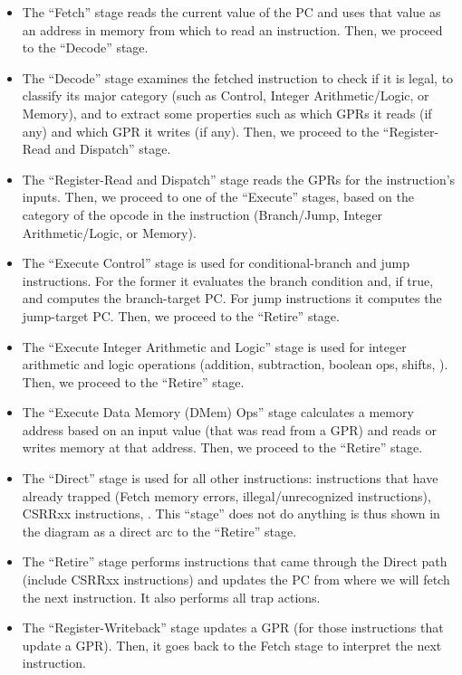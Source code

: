 \begin{itemize}

\item The ``Fetch'' stage reads the current value of the PC and uses
  that value as an address in memory from which to read an
  instruction.  Then, we proceed to the ``Decode'' stage.

\item The ``Decode'' stage examines the fetched instruction to check
  if it is legal, to classify its major category (such as Control,
  Integer Arithmetic/Logic, or Memory), and to extract some properties
  such as which GPRs it reads (if any) and which GPR it writes (if
  any).  Then, we proceed to the ``Register-Read and Dispatch'' stage.

\item The ``Register-Read and Dispatch'' stage reads the GPRs for the
instruction's inputs.  Then, we proceed to one of the ``Execute''
stages, based on the category of the opcode in the instruction
(Branch/Jump, Integer Arithmetic/Logic, or Memory).

\item The ``Execute Control'' stage is used for conditional-branch and
jump instructions.  For the former it evaluates the branch condition
and, if true, and computes the branch-target PC.  For jump
instructions it computes the jump-target PC.  Then, we proceed to the
``Retire'' stage.

\item The ``Execute Integer Arithmetic and Logic'' stage is used for
integer arithmetic and logic operations (addition, subtraction,
boolean ops, shifts, {\etc}).  Then, we proceed to the ``Retire''
stage.

\item The ``Execute Data Memory (DMem) Ops'' stage calculates a memory
address based on an input value (that was read from a GPR) and reads
or writes memory at that address.  Then, we proceed to the ``Retire''
stage.

\item The ``Direct'' stage is used for all other instructions:
instructions that have already trapped (Fetch memory errors,
illegal/unrecognized instructions), CSRRxx instructions, {\etc}.  This
``stage'' does not do anything is thus shown in the diagram as a
direct arc to the ``Retire'' stage.

\item The ``Retire'' stage performs instructions that came through the
Direct path (include CSRRxx instructions) and updates the PC from
where we will fetch the next instruction.  It also performs all trap
actions.

\item The ``Register-Writeback'' stage updates a GPR (for those
instructions that update a GPR).  Then, it goes back to the Fetch
stage to interpret the next instruction.

\end{itemize}


